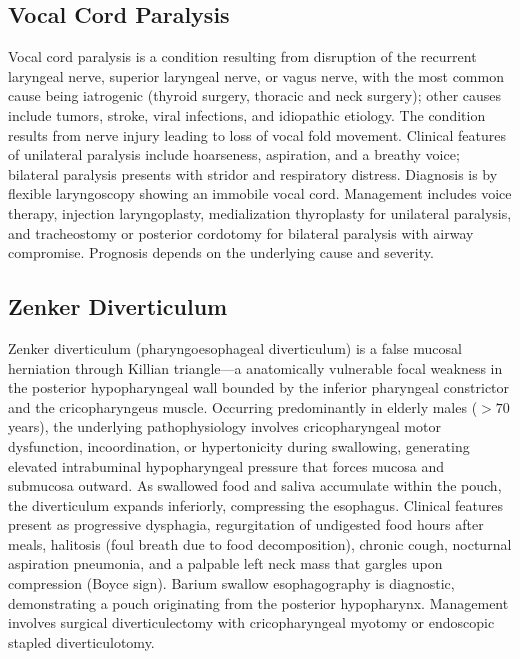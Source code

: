 \subsection{Vocal Cord Paralysis}
\label{sec:Vocal Cord Paralysis}
Vocal cord paralysis is a condition resulting from disruption of the recurrent laryngeal nerve, superior laryngeal nerve, or vagus nerve, with the most common cause being iatrogenic (thyroid surgery, thoracic and neck surgery); other causes include tumors, stroke, viral infections, and idiopathic etiology. The condition results from nerve injury leading to loss of vocal fold movement. Clinical features of unilateral paralysis include hoarseness, aspiration, and a breathy voice; bilateral paralysis presents with stridor and respiratory distress. Diagnosis is by flexible laryngoscopy showing an immobile vocal cord. Management includes voice therapy, injection laryngoplasty, medialization thyroplasty for unilateral paralysis, and tracheostomy or posterior cordotomy for bilateral paralysis with airway compromise. Prognosis depends on the underlying cause and severity.

\subsection{Zenker Diverticulum}
\label{sec:Zenker Diverticulum}
Zenker diverticulum (pharyngoesophageal diverticulum) is a false mucosal herniation through Killian triangle---a anatomically vulnerable focal weakness in the posterior hypopharyngeal wall bounded by the inferior pharyngeal constrictor and the cricopharyngeus muscle. Occurring predominantly in elderly males ($>70$ years), the underlying pathophysiology involves cricopharyngeal motor dysfunction, incoordination, or hypertonicity during swallowing, generating elevated intrabuminal hypopharyngeal pressure that forces mucosa and submucosa outward. As swallowed food and saliva accumulate within the pouch, the diverticulum expands inferiorly, compressing the esophagus. Clinical features present as progressive dysphagia, regurgitation of undigested food hours after meals, halitosis (foul breath due to food decomposition), chronic cough, nocturnal aspiration pneumonia, and a palpable left neck mass that gargles upon compression (Boyce sign). Barium swallow esophagography is diagnostic, demonstrating a pouch originating from the posterior hypopharynx. Management involves surgical diverticulectomy with cricopharyngeal myotomy or endoscopic stapled diverticulotomy.


